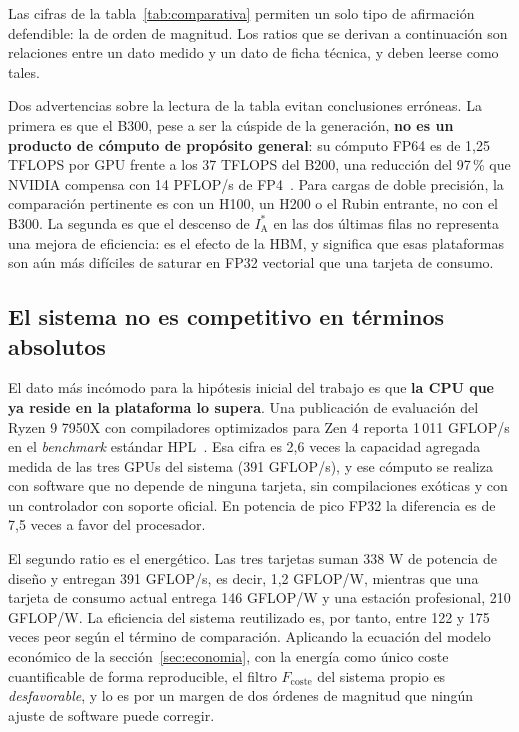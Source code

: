 \documentclass[a4paper,11pt]{article}
\begin{document}
Las cifras de la tabla~\ref{tab:comparativa} permiten un solo tipo de afirmación defendible: la de orden de magnitud. Los ratios
que se derivan a continuación son relaciones entre un dato medido y un dato de ficha técnica, y deben leerse como tales.

Dos advertencias sobre la lectura de la tabla evitan conclusiones erróneas. La primera es que el B300, pese a ser la cúspide de
la generación, \textbf{no es un producto de cómputo de propósito general}: su cómputo FP64 es de 1,25 TFLOPS por GPU frente a
los 37 TFLOPS del B200, una reducción del 97\,\% que NVIDIA compensa con 14 PFLOP/s de FP4~\cite{nvidiablackwellultra}. Para
cargas de doble precisión, la comparación pertinente es con un H100, un H200 o el Rubin entrante, no con el B300. La segunda es
que el descenso de $I_{\text{A}}^{*}$ en las dos últimas filas no representa una mejora de eficiencia: es el efecto de la HBM, y
significa que esas plataformas son aún más difíciles de saturar en FP32 vectorial que una tarjeta de consumo.

\subsection*{El sistema no es competitivo en términos absolutos}

El dato más incómodo para la hipótesis inicial del trabajo es que \textbf{la CPU que ya reside en la plataforma lo supera}. Una
publicación de evaluación del Ryzen 9 7950X con compiladores optimizados para Zen 4 reporta 1\,011 GFLOP/s en el \textit{benchmark}
estándar HPL~\cite{puget7950x}. Esa cifra es 2,6 veces la capacidad agregada medida de las tres GPUs del sistema (391 GFLOP/s), y
ese cómputo se realiza con software que no depende de ninguna tarjeta, sin compilaciones exóticas y con un controlador con soporte
oficial. En potencia de pico FP32 la diferencia es de 7,5 veces a favor del procesador.

El segundo ratio es el energético. Las tres tarjetas suman 338 W de potencia de diseño y entregan 391 GFLOP/s, es decir, 1,2
GFLOP/W, mientras que una tarjeta de consumo actual entrega 146 GFLOP/W y una estación profesional, 210 GFLOP/W. La eficiencia
del sistema reutilizado es, por tanto, entre 122 y 175 veces peor según el término de comparación. Aplicando la ecuación del
modelo económico de la sección~\ref{sec:economia}, con la energía como único coste cuantificable de forma
reproducible, el filtro $F_{\text{coste}}$ del sistema propio es \emph{desfavorable}, y lo es por un margen de dos órdenes de
magnitud que ningún ajuste de software puede corregir.
\end{document}

